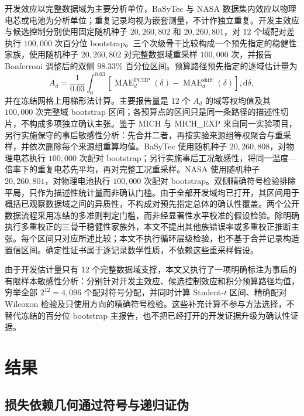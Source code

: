 \documentclass[UTF8,11pt]{ctexart}
\begin{document}
开发效应以完整数据域为主要分析单位，BaSyTec 与 NASA 数据集内效应以物理电芯或电池为分析单位；重复记录均视为嵌套测量，不计作独立重复。开发主效应与候选控制分别使用固定随机种子 $20{,}260{,}802$ 和 $20{,}260{,}801$，对 $12$ 个域配对差执行 $100{,}000$ 次百分位 bootstrap。三个次级骨干比较构成一个预先指定的稳健性家族，使用随机种子 $20{,}260{,}802$ 对完整数据域重采样 $100{,}000$ 次，并报告 Bonferroni 调整后的双侧 $98.33\%$ 百分位区间。预算路径预先指定的逐域估计量为
\begin{equation}
A_d=\frac{1}{0.03}\int_{0}^{0.03}
\left[\operatorname{MAE}^{\mathrm{PCHP}}_d(\delta)-
\operatorname{MAE}^{\mathrm{shift}}_d(\delta)\right],\mathrm d\delta,
\label{eq:budget_auc_zh}
\end{equation}
并在冻结网格上用梯形法计算。主要报告量是 $12$ 个 $A_d$ 的域等权均值及其 $100{,}000$ 次完整域 bootstrap 区间；各预算点的区间只是同一条路径的描述性切片，不构成多项独立确认主张。鉴于 MICH 与 MICH\_EXP 来自同一实验项目，另行实施保守的事后敏感性分析：先合并二者，再按实验来源组等权聚合与重采样，并依次删除每个来源组重算均值。BaSyTec 使用随机种子 $20{,}260{,}808$，对物理电芯执行 $100{,}000$ 次配对 bootstrap；另行实施事后工况敏感性，将同一温度—倍率下的重复电芯先平均，再对完整工况重采样。NASA 使用随机种子 $20{,}260{,}801$，对物理电池执行 $100{,}000$ 次配对 bootstrap。双侧精确符号检验排除平局，只作为描述性统计量而非确认门槛。由于全部开发域均已打开，其区间用于概括已观察数据域之间的异质性，不构成对预先指定总体的确认性覆盖。两个公开数据流程采用冻结的多准则判定门槛，而非经显著性水平校准的假设检验。除明确执行多重校正的三骨干稳健性家族外，本文不提出其他族错误率或多重校正推断主张。每个区间只对应所述比较；本文不执行循环层级检验，也不基于合并记录构造置信区间。确定性证书属于逐记录数学性质，不依赖这些重采样假设。

由于开发估计量只有 $12$ 个完整数据域支撑，本文又执行了一项明确标注为事后的有限样本敏感性分析：分别针对开发主效应、候选控制效应和积分预算路径均值，穷举全部 $2^{12}=4{,}096$ 个配对符号分配，并同时计算 Student-$t$ 区间、精确配对 Wilcoxon 检验及只使用方向的精确符号检验。这些补充计算不参与方法选择，不替代冻结的百分位 bootstrap 主报告，也不把已经打开的开发证据升级为确认性证据。

\section{结果}

\subsection{损失依赖几何通过符号与递归证伪}
\end{document}
